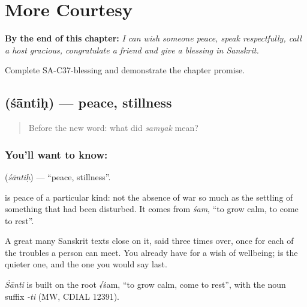 
\chapter{More Courtesy}
\label{ch:sa-courtesy-more}

\begin{chapteropening}
\textbf{By the end of this chapter:} \emph{I can wish someone peace, speak respectfully, call a host gracious, congratulate a friend and give a blessing in Sanskrit.}

Complete SA-C37-blessing and demonstrate the chapter promise.
\end{chapteropening}

\section[\texorpdfstring{\sk{शान्तिः} (śāntiḥ)}{शान्तिः (śāntiḥ)}]{ (śāntiḥ) — peace, stillness}

\label{lesson:SA-C37-peace}



\begin{quote}
Before the new word: what did \emph{samyak} mean?
\end{quote}

\subsection*{You'll want to know: }
\textbf{} (\emph{śāntiḥ}) — \textquotedblleft{}peace, stillness\textquotedblright{}.

\textbf{} is peace of a particular kind: not the absence of war so much as the settling of something that had been disturbed. It comes from \emph{śam}, \textquotedblleft{}to grow calm, to come to rest\textquotedblright{}.

A great many Sanskrit texts close on it, said three times over, once for each of the troubles a person can meet. You already have \textbf{} for a wish of wellbeing; \textbf{} is the quieter one, and the one you would say last.

\begin{cousinweb}
\emph{Śānti} is built on the root √śam, \textquotedblleft{}to grow calm, come to rest\textquotedblright{}, with the noun suffix \emph{-ti} (MW, CDIAL 12391).
\end{cousinweb}

